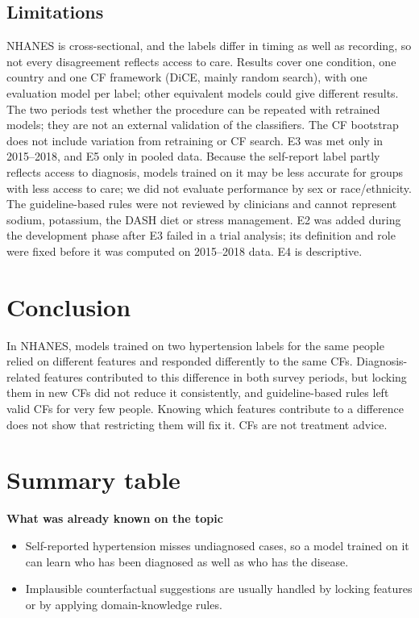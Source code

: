 \documentclass[final,5p,times,twocolumn]{elsarticle}
\providecommand{\tightlist}{\setlength{\itemsep}{0pt}\setlength{\parskip}{0pt}}
\begin{document}
\subsection{Limitations}

NHANES is cross-sectional, and the labels differ in timing as well as
recording, so not every disagreement reflects access to care. Results
cover one condition, one country and one CF framework (DiCE, mainly
random search), with one evaluation model per label; other equivalent
models could give different results. The two periods test whether the
procedure can be repeated with retrained models; they are not an
external validation of the classifiers. The CF bootstrap does not
include variation from retraining or CF search. E3 was met only in
2015--2018, and E5 only in pooled data. Because the self-report label
partly reflects access to diagnosis, models trained on it may be less
accurate for groups with less access to care; we did not evaluate
performance by sex or race/ethnicity. The guideline-based rules were not
reviewed by clinicians and cannot represent sodium, potassium, the DASH
diet or stress management. E2 was added during the development phase
after E3 failed in a trial analysis; its definition and role were fixed
before it was computed on 2015--2018 data. E4 is descriptive.

\section{Conclusion}

In NHANES, models trained on two hypertension labels for the same people
relied on different features and responded differently to the same CFs.
Diagnosis-related features contributed to this difference in both survey
periods, but locking them in new CFs did not reduce it consistently, and
guideline-based rules left valid CFs for very few people. Knowing which
features contribute to a difference does not show that restricting them
will fix it. CFs are not treatment advice.


\section*{Summary table}
\textbf{What was already known on the topic}

\begin{itemize}
\tightlist
\item
  Self-reported hypertension misses undiagnosed cases, so a model
  trained on it can learn who has been diagnosed as well as who has the
  disease.
\item
  Implausible counterfactual suggestions are usually handled by locking
  features or by applying domain-knowledge rules.
\end{itemize}
\end{document}
